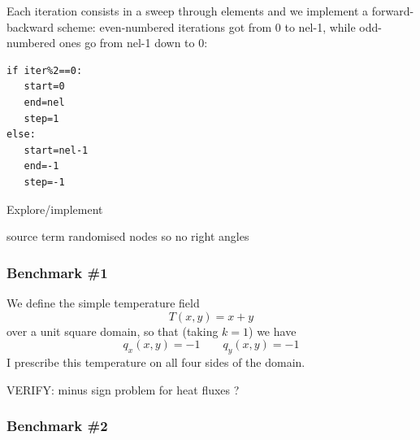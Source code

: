 Each iteration consists in a sweep through elements and we implement a forward-backward scheme:
even-numbered iterations got from 0 to nel-1, while odd-numbered ones go from nel-1 down to 0:
\begin{lstlisting}
if iter%2==0:
   start=0
   end=nel
   step=1
else:
   start=nel-1
   end=-1
   step=-1
\end{lstlisting}





\newpage

Explore/implement

source term
randomised nodes so no right angles




\subsubsection*{Benchmark \#1} 

We define the simple temperature field 
\[
T(x,y)=x+y
\]
over a unit square domain, so that (taking $k=1$) we have
\[
q_x(x,y)=-1
\qquad
q_y(x,y)=-1
\]
I prescribe this temperature on all four sides of the domain. 


VERIFY: minus sign problem for heat fluxes ?


\subsubsection*{Benchmark \#2} 
